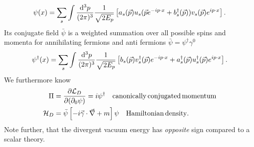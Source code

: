 \begin{equation}
		\psi(x) = \sum_s \int \frac{\mathrm{d}^3 p}{(2 \pi)^3} \frac{1}{\sqrt{2E_p}} \left[a_s(\vec{p})u_s(\vec{p} e^{-ip\cdot x} + b^{\dagger}_s(\vec{p}))v_s(\vec{p}) e^{i p\cdot x}  \right].
\end{equation}
Its conjugate field $\bar{\psi}$ is a weighted summation over all possible spins and momenta for annihilating fermions and anti fermions $\bar{\psi}=\psi^{\dagger} \gamma^0$
\begin{equation}
	\psi^{\dagger} (x) = \sum_s \int \frac{\mathrm{d}^3 p}{(2 \pi)^3} \frac{1}{\sqrt{2 E_p}} \left[b_s(\vec{p})v^{\dagger}_s(\vec{p})e^{-i p\cdot x} + a^{\dagger}_s(\vec{p}) u^{\dagger}_s(\vec{p}) e^{i p\cdot x} \right].
\end{equation}
We furthermore know
\begin{align}
	\Pi &= \frac{\partial \mathcal{L}_D}{\partial(\partial_0 \psi)} = i \psi^{\dagger} \quad \mathrm{canonically \, conjugated\, momentum}\\
	\mathcal{H}_D &= \bar{\psi} \left[- i \vec{\gamma} \cdot \vec{\nabla} +m\right] \psi \quad \mathrm{Hamiltonian\, density}.
\end{align}
Note further, that the divergent vacuum energy has \emph{opposite} sign compared to a scalar theory.\\
